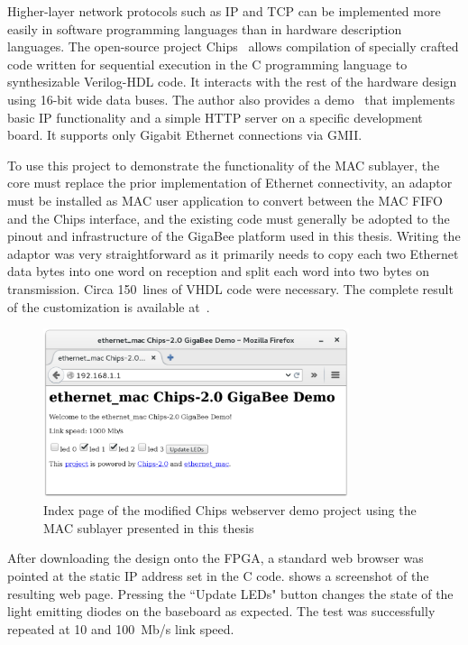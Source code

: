 \documentclass[a4paper, 11pt, oneside]{Thesis}  %
\begin{document}
Higher-layer network protocols such as IP and TCP can be implemented more easily in software programming languages than in hardware description languages. The open-source project Chips~\cite{Chips} allows compilation of specially crafted code written for sequential execution in the C programming language to synthesizable Verilog-HDL code. It interacts with the rest of the hardware design using 16-bit wide data buses. The author also provides a demo~\cite{GithubChipsDemoOrig} that implements basic IP functionality and a simple HTTP server on a specific development board. It supports only Gigabit Ethernet connections via GMII.

To use this project to demonstrate the functionality of the MAC sublayer, the core must replace the prior implementation of Ethernet connectivity, an adaptor must be installed as MAC user application to convert between the MAC FIFO and the Chips interface, and the existing code must generally be adopted to the pinout and infrastructure of the GigaBee platform used in this thesis. Writing the adaptor was very straightforward as it primarily needs to copy each two Ethernet data bytes into one word on reception and split each word into two bytes on transmission. Circa 150~lines of VHDL code were necessary. The complete result of the customization is available at~\cite{GithubChipsDemo}.

\begin{figure}
\centering
\includegraphics[width=0.8\textwidth]{Figures/chipsweb.png}
\caption{Index page of the modified Chips webserver demo project using the MAC sublayer presented in this thesis}
\label{fig:chipsweb}
\end{figure}

After downloading the design onto the FPGA, a standard web browser was pointed at the static IP address set in the C code.  shows a screenshot of the resulting web page. Pressing the ``Update LEDs" button changes the state of the light emitting diodes on the baseboard as expected. The test was successfully repeated at 10 and 100~Mb/s link speed.
\end{document}
